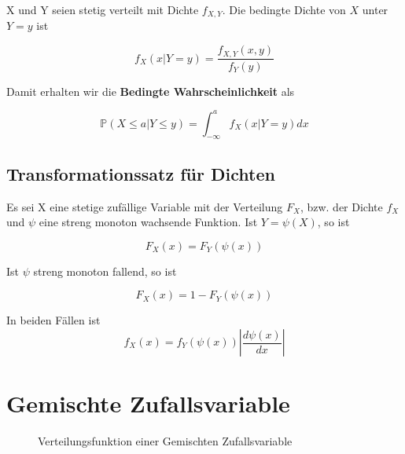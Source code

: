 {\begin{definition}
        X und Y seien stetig verteilt mit Dichte $f_{X,Y}$.
        Die bedingte Dichte von $X$ unter $Y=y$ ist

        \[
            f_{X}\left(x|Y=y\right)=\frac{f_{X,Y}(x,y)}{f_{Y}(y)}
        \]
    \end{definition}

    Damit erhalten wir die \textbf{Bedingte Wahrscheinlichkeit} als

    \[
    \mathbb P\left(X\le a|Y\le y\right)=\int_{-{\infty}}^{a}{f_{X}\left(x|Y=y\right)}dx
    \]
    
    \bigskip

    \subsection{Transformationssatz für Dichten}
    \label{sec:transformationssatz_dichten}
    \begin{definition}
    Es sei X eine stetige zufällige Variable mit der Verteilung $F_{X}$, {bzw. der Dichte} $f_{X}$
    und $\psi$ eine streng monoton wachsende Funktion. Ist $Y=\psi\left(X\right)$, so ist

    \[
    F_{X}\left(x\right)=F_{Y}\left(\psi \left(x\right)\right)
    \]

    Ist $\psi$ streng monoton fallend, so ist

    \[
    F_{X}\left(x\right)=1-F_{Y}\left(\psi \left(x\right)\right)
    \]

    In beiden Fällen ist
    \[
    f_{X}\left(x\right)=f_{Y}\left(\psi \left(x\right)\right)\left|\frac{d\psi (x)}{dx}\right|
    \]

    \label{satz:verteilung_x_y}

    \end{definition}


    \section{Gemischte Zufallsvariable}
    \begin{figure}
    \centering
        \begin{tikzpicture}
            
        \end{tikzpicture}
        \caption{Verteilungsfunktion einer Gemischten Zufallsvariable}%
        \label{fig:gemischte_verteilung}
    \end{figure}

}
